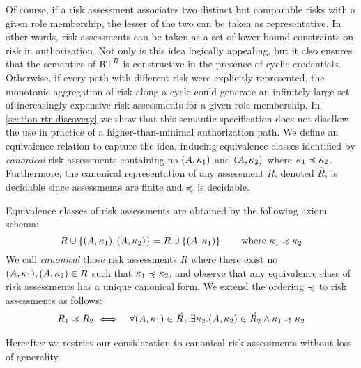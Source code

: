 Of course, if a risk assessment associates two distinct but comparable
risks with a given role membership, the lesser of the two can be taken
as representative.  In other words, risk assessments can be taken as a
set of lower bound constraints on risk in authorization.  Not only is
this idea logically appealing, but it also ensures that the semantics
of $\text{RT}^R$ is constructive in the presence of cyclic credentials.
Otherwise, if every path with different risk were explicitly
represented, the monotonic aggregation of risk along a cycle could
generate an infinitely large set of increasingly expensive risk
assessments for a given role membership.  In
\autoref{section-rtr-discovery} we show that this semantic
specification does not disallow the use in practice of a
higher-than-minimal authorization path.  We define an equivalence
relation to capture the idea, inducing equivalence classes identified
by \emph{canonical} risk assessments containing no $(A,\kappa_1)$ and
$(A,\kappa_2)$ where $\kappa_1 \preccurlyeq \kappa_2$.  Furthermore, the canonical
representation of any assessment $R$, denoted $\hat{R}$, is decidable
since assessments are finite and $\preccurlyeq$ is decidable.
\begin{definition}
Equivalence classes of risk assessments are obtained by the 
following axiom schema:
$$
R \cup \left\{(A,\kappa_1),(A,\kappa_2)\right\} = R \cup \left\{(A,\kappa_1)\right\} 
\qquad \text{where } \kappa_1 \preccurlyeq \kappa_2 
$$ 
We call \emph{canonical} those risk assessments $R$ where there
exist no $(A,\kappa_1), (A,\kappa_2) \in R$ such that $\kappa_1 \preccurlyeq \kappa_2$,
and observe that any equivalence class of risk assessments has 
a unique canonical form.  We extend the 
ordering $\preccurlyeq$ to risk assessments as follows:
\begin{eqnarray*}
R_1 \preccurlyeq R_2 &\iff& \forall (A,\kappa_1) \in \hat{R_1} . \exists
\kappa_2.  (A,\kappa_2) \in \hat{R_2} \wedge \kappa_1 \preccurlyeq \kappa_2
\end{eqnarray*}
\end{definition}
Hereafter we restrict our consideration to canonical risk assessments
without loss of generality.  

